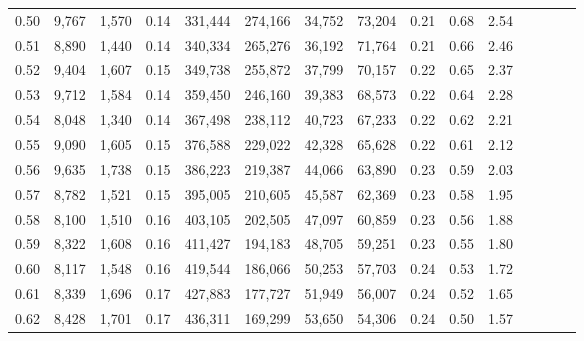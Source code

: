 \begin{tabular}{rrrcrrrrrrrrrrr}
0.50 &   9,767 &  1,570 &                                       0.14 &  331,444 &  274,166 &   34,752 &   73,204 &  0.21 &  0.68 &                         2.54 \\
0.51 &   8,890 &  1,440 &                                       0.14 &  340,334 &  265,276 &   36,192 &   71,764 &  0.21 &  0.66 &                         2.46 \\
0.52 &   9,404 &  1,607 &                                       0.15 &  349,738 &  255,872 &   37,799 &   70,157 &  0.22 &  0.65 &                         2.37 \\
0.53 &   9,712 &  1,584 &                                       0.14 &  359,450 &  246,160 &   39,383 &   68,573 &  0.22 &  0.64 &                         2.28 \\
0.54 &   8,048 &  1,340 &                                       0.14 &  367,498 &  238,112 &   40,723 &   67,233 &  0.22 &  0.62 &                         2.21 \\
0.55 &   9,090 &  1,605 &                                       0.15 &  376,588 &  229,022 &   42,328 &   65,628 &  0.22 &  0.61 &                         2.12 \\
0.56 &   9,635 &  1,738 &                                       0.15 &  386,223 &  219,387 &   44,066 &   63,890 &  0.23 &  0.59 &                         2.03 \\
0.57 &   8,782 &  1,521 &                                       0.15 &  395,005 &  210,605 &   45,587 &   62,369 &  0.23 &  0.58 &                         1.95 \\
0.58 &   8,100 &  1,510 &                                       0.16 &  403,105 &  202,505 &   47,097 &   60,859 &  0.23 &  0.56 &                         1.88 \\
0.59 &   8,322 &  1,608 &                                       0.16 &  411,427 &  194,183 &   48,705 &   59,251 &  0.23 &  0.55 &                         1.80 \\
0.60 &   8,117 &  1,548 &                                       0.16 &  419,544 &  186,066 &   50,253 &   57,703 &  0.24 &  0.53 &                         1.72 \\
0.61 &   8,339 &  1,696 &                                       0.17 &  427,883 &  177,727 &   51,949 &   56,007 &  0.24 &  0.52 &                         1.65 \\
0.62 &   8,428 &  1,701 &                                       0.17 &  436,311 &  169,299 &   53,650 &   54,306 &  0.24 &  0.50 &                         1.57 \\

\end{tabular}
